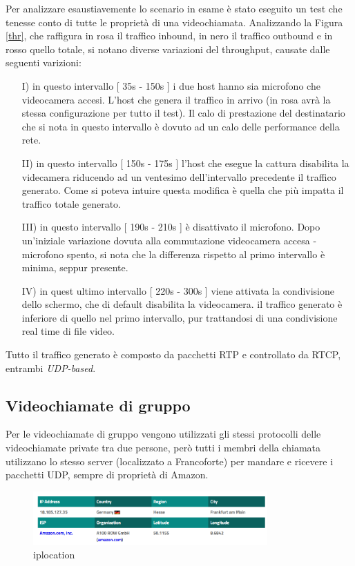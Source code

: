 \documentclass{article}
\begin{document}
    Per analizzare esaustiavemente lo scenario in esame è stato eseguito un test che tenesse
    conto di tutte le proprietà di una videochiamata. Analizzando la Figura \ref{thr}, che raffigura in rosa il traffico inbound, in nero 
    il traffico outbound e in rosso quello totale, si notano diverse variazioni del throughput, causate dalle seguenti varizioni:
    \begin{itemize}
      \item[I)] in questo intervallo [ 35s - 150s ] i due host hanno sia microfono che videocamera accesi. L'host che genera il traffico in arrivo (in rosa avrà la stessa configurazione per tutto il test). Il calo di prestazione del destinatario che si nota in questo intervallo è dovuto ad un calo delle performance della rete. 
      \item[II)] in questo intervallo [ 150s - 175s ] l'host che esegue la cattura disabilita la videcamera riducendo ad un ventesimo dell'intervallo precedente il traffico generato. Come si poteva intuire questa modifica è quella che più impatta il traffico totale generato.
      \item[III)] in questo intervallo [ 190s - 210s ] è disattivato il microfono. Dopo un'iniziale variazione dovuta alla commutazione videocamera accesa - microfono spento, si nota che la differenza rispetto al primo intervallo è minima, seppur presente.
      \item[IV)] in quest ultimo intervallo [ 220s - 300s ] viene attivata la condivisione dello schermo, che di default disabilita la videocamera. il traffico generato è inferiore di quello nel primo intervallo, pur trattandosi di una condivisione real time di file video.
    \end{itemize}
    Tutto il traffico generato è composto da pacchetti RTP e controllato da RTCP, entrambi \textit{UDP-based}. 

    \subsection{Videochiamate di gruppo}
    \vspace{-10pt}

    Per le videochiamate di gruppo vengono utilizzati gli stessi protocolli delle videochiamate private tra due persone,
    però  tutti i membri della chiamata utilizzano lo stesso server (localizzato a Francoforte) per mandare e ricevere i pacchetti UDP, 
    sempre di proprietà di Amazon.

    \begin{figure}[h]
      \centering
      
      \includegraphics[width=0.8\textwidth]{francoforte.png}
      \vspace{-10pt}
      \caption{iplocation}\label{who}
    \end{figure}
    
\end{document}
